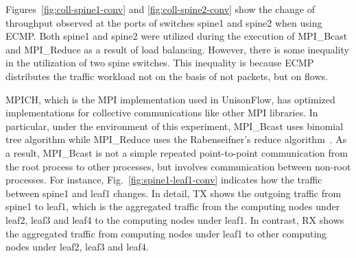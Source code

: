 Figures~\ref{fig:coll-spine1-conv} and \ref{fig:coll-spine2-conv} show
the change of throughput observed at the ports of switches spine1 and
spine2 when using ECMP\@. Both spine1 and spine2 were utilized during the
execution of MPI\_Bcast and MPI\_Reduce as a result of load balancing.
However, there is some inequality in the utilization of two spine
switches. This inequality is because ECMP distributes the traffic
workload not on the basis of not packets, but on flows.

MPICH, which is the MPI implementation used in UnisonFlow, has optimized
implementations for collective communications like other MPI libraries.
In particular, under the environment of this experiment, MPI\_Bcast uses
binomial tree algorithm while MPI\_Reduce uses the Rabenseifner's reduce
algorithm~\autocite{Rabenseifner2004}. As a result, MPI\_Bcast is not a
simple repeated point-to-point communication from the root process to
other processes, but involves communication between non-root processes.
For instance, Fig.~\ref{fig:spine1-leaf1-conv} indicates how the traffic
between spine1 and leaf1 changes. In detail, TX shows the outgoing
traffic from spine1 to leaf1, which is the aggregated traffic from the
computing nodes under leaf2, leaf3 and leaf4 to the computing nodes
under leaf1. In contrast, RX shows the aggregated traffic from computing
nodes under leaf1 to other computing nodes under leaf2, leaf3 and leaf4.

